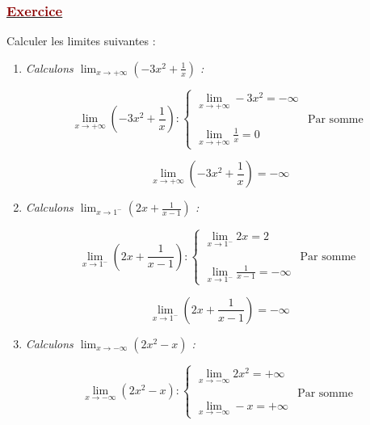 \documentclass[12pt,a4paper]{article}
\begin{document}
\subsubsection*{\underline{\textcolor{darkred}{ Exercice }}}

Calculer les limites suivantes :

\begin{enumerate}
    \item \textit{Calculons $\displaystyle \lim_{x \to +\infty} \left(-3x^2 + \frac{1}{x}\right)$ :}
    
    \vspace{0.2cm}
    
    \[
    \lim_{x \to +\infty} \left(-3x^2 + \frac{1}{x}\right) :
    \begin{cases}
    \displaystyle \lim_{x \to +\infty} -3x^2 = -\infty \\
    & \text{Par somme} \\
    \displaystyle \lim_{x \to +\infty} \frac{1}{x} = 0
    \end{cases}
    \]
    
    \[
    \boxed{\lim_{x \to +\infty} \left(-3x^2 + \frac{1}{x}\right) = -\infty}
    \]

    \vspace{0.4cm}

    \item \textit{Calculons $\displaystyle \lim_{x \to 1^-} \left(2x + \frac{1}{x - 1}\right)$ :}
    
    \vspace{0.2cm}
    
    \[
    \lim_{x \to 1^-} \left(2x + \frac{1}{x - 1}\right) :
    \begin{cases}
    \displaystyle \lim_{x \to 1^-} 2x = 2 \\
    & \text{Par somme} \\
    \displaystyle \lim_{x \to 1^-} \frac{1}{x - 1} = -\infty
    \end{cases}
    \]
    
    \[
    \boxed{\lim_{x \to 1^-} \left(2x + \frac{1}{x - 1}\right) = -\infty}
    \]

    \vspace{0.4cm}

    \item \textit{Calculons $\displaystyle \lim_{x \to -\infty} (2x^2 - x)$ :}
    
    \vspace{0.2cm}
    
    \[
    \lim_{x \to -\infty} (2x^2 - x) :
    \begin{cases}
    \displaystyle \lim_{x \to -\infty} 2x^2 = +\infty \\
    & \text{Par somme} \\
    \displaystyle \lim_{x \to -\infty} -x = +\infty
    \end{cases}
    \]
    

\end{enumerate}
\end{document}
